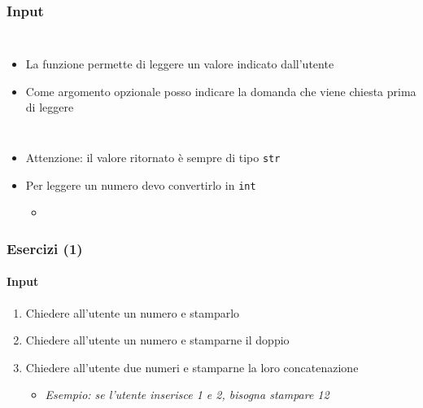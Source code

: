 \begin{contentframe}
    \frametitle{Input}

    \begin{columns}
        \begin{itemize}
            \item La funzione  permette di leggere un valore indicato dall'utente
    
            \bigskip
            \item Come argomento opzionale posso indicare la domanda che viene chiesta prima di leggere
        \end{itemize}
        
        \centering
    \end{columns}

    \bigskip
    \begin{itemize}
        \item Attenzione: il valore ritornato è sempre di tipo \texttt{str}
        \item Per leggere un numero devo convertirlo in \texttt{int}
        \begin{itemize}
            \item {}
        \end{itemize}
    \end{itemize}
\end{contentframe}

\begin{exerciseframe}
    \frametitle{Esercizi (1)}
    \framesubtitle{Input}

    \begin{enumerate}
        \item Chiedere all'utente un numero e stamparlo

        \bigskip
        \item Chiedere all'utente un numero e stamparne il doppio
        
        \bigskip
        \item Chiedere all'utente due numeri e stamparne la loro concatenazione
        \begin{itemize}
            \item \textit{Esempio: se l'utente inserisce 1 e 2, bisogna stampare 12}
        \end{itemize}
    \end{enumerate}
\end{exerciseframe}

